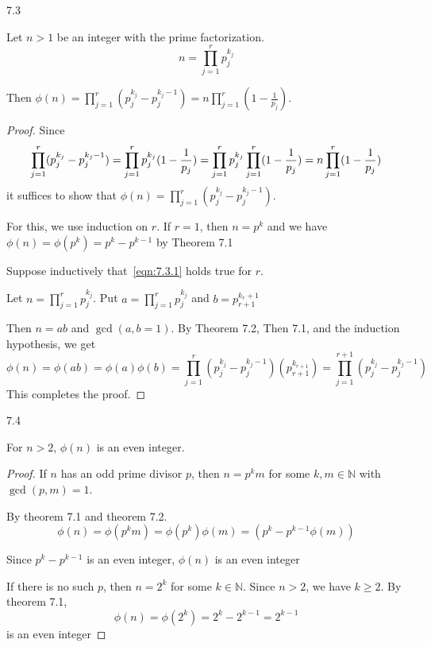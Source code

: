 \begin{theorem}
    7.3

    Let $n > 1$ be an integer with the prime factorization.
    \begin{equation}   
        \tag{*} 
        n = \prod_{j=1}^{r}{p_j^{k_j}}
        \label{eqn:7.3.1}
    \end{equation}

    Then $\displaystyle \phi(n) = \prod_{j=1}^{r}{(p_j^{k_j} - p_j^{k_j-1})} = n \prod_{j=1}^{r}{(1-\frac{1}{p_j})}$.
\end{theorem}
\begin{proof}
    Since
    \[
        \prod_{j=1}^{r}(p_j^{k_j} - p_j^{k_j-1}) = \prod_{j=1}^{r}{p_j^{k_j}(1-\frac{1}{p_j})}\\
        = \prod_{j=1}^{r}{p_j^{k_j}} \prod_{j=1}^{r}(1-\frac{1}{p_j})
        = n \prod_{j=1}^{r}(1-\frac{1}{p_j})
    \]
    it suffices to show that $\phi(n) = \prod_{j=1}^{r}{(p_j^{k_j} - p_j^{k_j-1})}$.

    For this, we use induction on $r$. If $r = 1$, then $n = p^k$ and we have $\phi(n) = \phi(p^k) = p^k - p^{k-1}$ by Theorem 7.1

    Suppose inductively that~\eqref{eqn:7.3.1} holds true for $r$.

    Let $n = \prod_{j=1}^{r}{p_j^{k_j}}$. Put $a = \prod_{j=1}^{r}{p_j^{k_j}}$ and $b = p_{r+1}^{k_r+1}$

    Then $n = ab$ and $\gcd(a, b = 1)$. By Theorem 7.2, Then 7.1, and the induction hypothesis, we get
    \[
        \phi(n) = \phi(ab) = \phi(a) \phi(b)
        = \prod_{j=1}^{r}{(p_j^{k_j} - p_j^{k_j-1})} (p_{r+1}^{k_{r+1}})
        = \prod_{j=1}^{r+1}(p_j^{k_j} - p_j^{k_j-1})
    \]
    This completes the proof.
\end{proof}

\begin{theorem}
    7.4

    For $n > 2$, $\phi(n)$ is an even integer.
\end{theorem}
\begin{proof}
    If $n$ has an odd prime divisor $p$, then $n = p^k m$ for some $k, m \in \mathbb{N}$
    with $\gcd(p, m) = 1$.

    By theorem 7.1 and theorem 7.2.
    \[
        \phi(n) = \phi(p^k m) = \phi(p^k) \phi(m) = (p^k - p^{k - 1} \phi(m))
    \]

    Since $p^k - p^{k-1}$ is an even integer, $\phi(n)$ is an even integer

    If there is no such $p$, then $n = 2^k$ for some $k \in \mathbb{N}$.
    Since $n > 2$, we have $k \geq 2$. By theorem 7.1,
    \[
        \phi(n) = \phi(2^k) = 2^k - 2^{k-1} = 2^{k-1}
    \]
    is an even integer
\end{proof}

